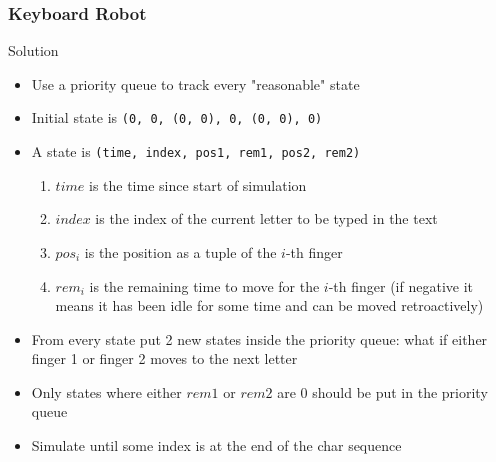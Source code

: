 \documentclass{beamer}
\begin{document}
\begin{frame}
    \frametitle{Keyboard Robot}
    \begin{block}{Solution}
        \begin{itemize}
            \item Use a priority queue to track every "reasonable" state
            \pause
            \item Initial state is {\tt (0, 0, (0, 0), 0, (0, 0), 0)}
            \pause
            \item A state is {\tt(time, index, pos1, rem1, pos2, rem2)}
            \begin{enumerate}
                \item $time$ is the time since start of simulation
                \item $index$ is the index of the current letter to be typed in the text
                \item $pos_{i}$ is the position as a tuple of the $i$-th finger
                \item $rem_{i}$ is the remaining time to move for the $i$-th finger (if negative it means it has been idle for some time and can be moved retroactively)

            \end{enumerate}
            \pause
            \item From every state put 2 new states inside the priority queue: what if either finger 1 or finger 2 moves to the next letter
            \pause
            \item Only states where either $rem1$ or $rem2$ are 0 should be put in the priority queue
            \pause
            \item Simulate until some index is at the end of the char sequence
        \end{itemize}
    \end{block} 
\end{frame}
\end{document}
